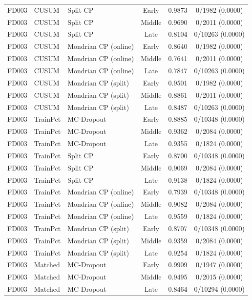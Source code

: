 \begin{table}[t]
\begin{tabular}{lllccc}
FD003 & CUSUM & Split CP & Early & 0.9873 & 0/1982 (0.0000) \\
FD003 & CUSUM & Split CP & Middle & 0.9690 & 0/2011 (0.0000) \\
FD003 & CUSUM & Split CP & Late & 0.8104 & 0/10263 (0.0000) \\
FD003 & CUSUM & Mondrian CP (online) & Early & 0.8640 & 0/1982 (0.0000) \\
FD003 & CUSUM & Mondrian CP (online) & Middle & 0.7641 & 0/2011 (0.0000) \\
FD003 & CUSUM & Mondrian CP (online) & Late & 0.7847 & 0/10263 (0.0000) \\
FD003 & CUSUM & Mondrian CP (split) & Early & 0.9501 & 0/1982 (0.0000) \\
FD003 & CUSUM & Mondrian CP (split) & Middle & 0.8861 & 0/2011 (0.0000) \\
FD003 & CUSUM & Mondrian CP (split) & Late & 0.8487 & 0/10263 (0.0000) \\
FD003 & TrainPct & MC-Dropout & Early & 0.8885 & 0/10348 (0.0000) \\
FD003 & TrainPct & MC-Dropout & Middle & 0.9362 & 0/2084 (0.0000) \\
FD003 & TrainPct & MC-Dropout & Late & 0.9355 & 0/1824 (0.0000) \\
FD003 & TrainPct & Split CP & Early & 0.8700 & 0/10348 (0.0000) \\
FD003 & TrainPct & Split CP & Middle & 0.9069 & 0/2084 (0.0000) \\
FD003 & TrainPct & Split CP & Late & 0.9138 & 0/1824 (0.0000) \\
FD003 & TrainPct & Mondrian CP (online) & Early & 0.7939 & 0/10348 (0.0000) \\
FD003 & TrainPct & Mondrian CP (online) & Middle & 0.9082 & 0/2084 (0.0000) \\
FD003 & TrainPct & Mondrian CP (online) & Late & 0.9559 & 0/1824 (0.0000) \\
FD003 & TrainPct & Mondrian CP (split) & Early & 0.8707 & 0/10348 (0.0000) \\
FD003 & TrainPct & Mondrian CP (split) & Middle & 0.9359 & 0/2084 (0.0000) \\
FD003 & TrainPct & Mondrian CP (split) & Late & 0.9254 & 0/1824 (0.0000) \\
FD003 & Matched & MC-Dropout & Early & 0.9909 & 0/1947 (0.0000) \\
FD003 & Matched & MC-Dropout & Middle & 0.9495 & 0/2015 (0.0000) \\
FD003 & Matched & MC-Dropout & Late & 0.8464 & 0/10294 (0.0000) \\

\end{tabular}
\end{table}
